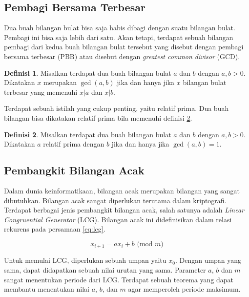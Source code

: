 \documentclass[10pt,conference]{IEEEtran}
\theoremstyle{definition}
\newtheorem{definition}{Definisi}[section]
\begin{document}
\subsection{Pembagi Bersama Terbesar}
Dua buah bilangan bulat bisa saja habis dibagi dengan suatu bilangan bulat. Pembagi ini bisa saja lebih dari satu. Akan tetapi, terdapat sebuah bilangan pembagi dari kedua buah bilangan
bulat tersebut yang disebut dengan pembagi bersama terbesar (PBB) atau disebut dengan \emph{greatest common divisor} (GCD). 

\begin{definition} \label{def:gcd}
    Misalkan terdapat dua buah bilangan bulat $a$ dan $b$ dengan $a,b > 0$. Dikatakan $x$ merupakan $\gcd{(a,b)}$ jika dan hanya jika $x$ bilangan bulat terbesar yang memenuhi $x | a$ dan $x | b$.
\end{definition}

Terdapat sebuah istilah yang cukup penting, yaitu relatif prima. Dua buah bilangan bisa dikatakan relatif prima bila memenuhi definisi \ref{def:relativeprime}.

\begin{definition} \label{def:relativeprime}
    Misalkan terdapat dua buah bilangan bulat $a$ dan $b$ dengan $a,b > 0$. Dikatakan $a$ relatif prima dengan $b$ jika dan hanya jika $\gcd{(a,b)} = 1$.
\end{definition}

\subsection{Pembangkit Bilangan Acak}
Dalam dunia keinformatikaan, bilangan acak merupakan bilangan yang sangat dibutuhkan. Bilangan acak sangat diperlukan terutama dalam kriptografi. Terdapat berbagai jenis pembangkit bilangan acak,
salah satunya adalah \emph{Linear Congruential Generator} (LCG). Bilangan acak ini didefinisikan dalam relasi rekurens pada persamaan \ref{eq:lcg}.

\begin{equation} \label{eq:lcg}
    x_{i+1} = ax_{i}+b \text{ (mod }m\text{)}
\end{equation}

Untuk memulai LCG, diperlukan sebuah umpan yaitu $x_0$. Dengan umpan yang sama, dapat didapatkan sebuah nilai urutan yang sama. 
Parameter $a$, $b$ dan $m$ sangat menentukan periode dari LCG. Terdapat sebuah teorema
yang dapat membantu menentukan nilai $a$, $b$, dan $m$ agar memperoleh periode maksimum. \cite{a1}
\end{document}
